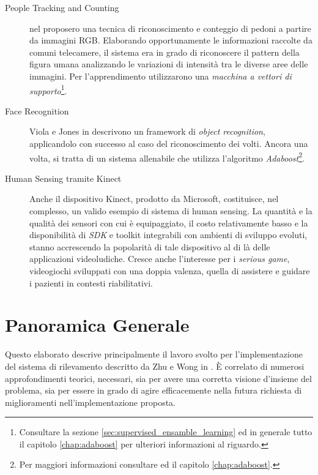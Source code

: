             \begin{description}
                \item[People Tracking and Counting] \citet{Papageorgiou98} nel \citeyear{Papageorgiou98} proposero una tecnica di riconoscimento e conteggio di pedoni a partire da immagini RGB.
                Elaborando opportunamente le informazioni raccolte da comuni telecamere, il sistema era in grado di riconoscere il pattern della figura umana analizzando le variazioni di intensità tra le diverse aree delle immagini.
                Per l'apprendimento utilizzarono una \emph{macchina a vettori di supporto}\footnote{Consultare la sezione \ref{sec:supervised_ensamble_learning} ed in generale tutto il capitolo \ref{chap:adaboost} per ulteriori informazioni al riguardo.}.
                
                \item[Face Recognition] Viola e Jones in \cite{Viola04} descrivono un framework di \emph{object recognition}, applicandolo con successo al caso del riconoscimento dei volti.
                Ancora una volta, si tratta di un sistema allenabile che utilizza l'algoritmo \emph{Adaboost}\footnote{Per maggiori informazioni consultare \cite{Freund97} ed il capitolo \ref{chap:adaboost}.}.

                \item[Human Sensing tramite Kinect] Anche il dispositivo Kinect, prodotto da Microsoft, costituisce, nel complesso, un valido esempio di sistema di human sensing.
                La quantità e la qualità dei sensori con cui è equipaggiato, il costo relativamente basso e la disponibilità di \emph{SDK} e toolkit integrabili con ambienti di sviluppo evoluti, stanno accrescendo la popolarità di tale dispositivo al di là delle applicazioni videoludiche.
                Cresce anche l'interesse per i \emph{serious game}, videogiochi sviluppati con una doppia valenza, quella di assistere e guidare i pazienti in contesti riabilitativi.
            \end{description}

    \section{Panoramica Generale}
    \label{sec:overview}
        Questo elaborato descrive principalmente il lavoro svolto per l'implementazione del sistema di rilevamento descritto da Zhu e Wong in \cite{Zhu13}.
        È correlato di numerosi approfondimenti teorici, necessari, sia per avere una corretta visione d'insieme del problema, sia per essere in grado di agire efficacemente nella futura richiesta di miglioramenti nell'implementazione proposta.

